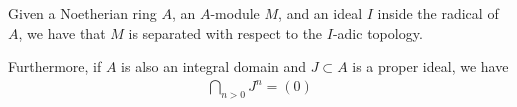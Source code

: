 \documentclass[12pt]{article}
\newcommand{\<}{\langle}
\renewcommand{\>}{\rangle}
\begin{document}
Given a Noetherian ring $A$, an $A$-module $M$, and an ideal $I$ inside the radical of $A$, we have that $M$ is separated with respect to the $I$-adic topology.

Furthermore, if $A$ is also an integral domain and $J\subset A$ is a proper ideal, we have
\begin{align*}
\bigcap_{n>0}J^n=(0)
\end{align*}
\end{document}
